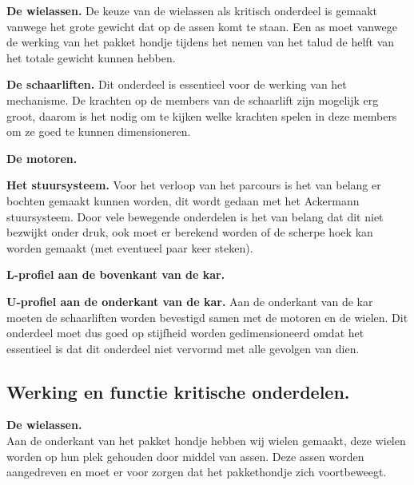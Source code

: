 \begin{description}
    \item \textbf{De wielassen.} De keuze van de wielassen als kritisch onderdeel is gemaakt vanwege het grote gewicht dat op de assen komt te staan. Een as moet vanwege de werking van het pakket hondje tijdens het nemen van het talud de helft van het totale gewicht kunnen hebben. \\

    \item \textbf{De schaarliften.} Dit onderdeel is essentieel voor de werking van het mechanisme. De krachten op de members van de schaarlift zijn mogelijk erg groot, daarom is het nodig om te kijken welke krachten spelen in deze members om ze goed te kunnen dimensioneren.\\

    \item \textbf{De motoren.}
    
    \item \textbf{Het stuursysteem.} Voor het verloop van het parcours is het van belang er bochten gemaakt kunnen worden, dit wordt gedaan met het Ackermann stuursysteem. Door vele bewegende onderdelen is het van belang dat dit niet bezwijkt onder druk, ook moet er berekend worden of de scherpe hoek kan worden gemaakt (met eventueel paar keer steken).\\
    
    \item \textbf{L-profiel aan de bovenkant van de kar.}

    \item \textbf{U-profiel aan de onderkant van de kar.} Aan de onderkant van de kar moeten de schaarliften worden bevestigd samen met de motoren en de wielen. Dit onderdeel moet dus goed op stijfheid worden gedimensioneerd omdat het essentieel is dat dit onderdeel niet vervormd met alle gevolgen van dien.\\ 
\end{description}

\vspace{\baselineskip}
\subsection{Werking en functie kritische onderdelen.}
\label{se:werking_kritische_onderdelen}

\textbf{De wielassen.}\\
Aan de onderkant van het pakket hondje hebben wij wielen gemaakt, deze wielen worden op hun plek gehouden door middel van assen. Deze assen worden aangedreven en moet er voor zorgen dat het pakkethondje zich voortbeweegt.\\
\vspace{\baselineskip}

